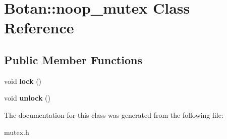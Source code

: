 \hypertarget{class_botan_1_1noop__mutex}{}\section{Botan\+:\+:noop\+\_\+mutex Class Reference}
\label{class_botan_1_1noop__mutex}
\subsection*{Public Member Functions}
\begin{DoxyCompactItemize}
\item 
\mbox{\label{class_botan_1_1noop__mutex_a1048fc69b67dbbc2f1fca74782c5e856}} 
void {\bfseries lock} ()
\item 
\mbox{\label{class_botan_1_1noop__mutex_af408cdb9c78ba2fda17fee0781b3ab53}} 
void {\bfseries unlock} ()
\end{DoxyCompactItemize}


The documentation for this class was generated from the following file\+:\begin{DoxyCompactItemize}
\item 
mutex.\+h\end{DoxyCompactItemize}
